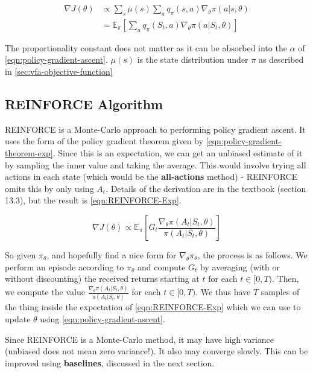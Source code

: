 \documentclass[11pt]{report}
\begin{document}
\begin{align}
	\label{eqn:policy-gradient-theorem}
	\nabla J(\theta) &\propto \sum_s \mu(s) \sum_a q_\pi(s, a) \nabla_{\theta} \pi (a | s, \theta)\\
		\label{eqn:policy-gradient-theorem-exp}
		&= \mathbb{E}_\pi\left[\sum_a q_\pi(S_t, a) \nabla_{\theta} \pi (a | S_t, \theta)\right]
\end{align}

The proportionality constant does not matter as it can be absorbed into the $\alpha$ of \autoref{eqn:policy-gradient-ascent}. $\mu(s)$ is the state distribution under $\pi$ as described in \autoref{sec:vfa-objective-function}

\subsection{REINFORCE Algorithm}
REINFORCE is a Monte-Carlo approach to performing policy gradient ascent. It uses the form of the policy gradient theorem given by \autoref{eqn:policy-gradient-theorem-exp}. Since this is an expectation, we can get an unbiased estimate of it by sampling the inner value and taking the average. This would involve trying all actions in each state (which would be the \textbf{all-actions} method) - REINFORCE omits this by only using $A_t$. Details of the derivation are in the textbook (section 13.3), but the result is \autoref{eqn:REINFORCE-Exp}.

\begin{equation}
	\label{eqn:REINFORCE-Exp}
	\nabla J(\theta) \propto \mathbb{E}_\pi\left[G_t \frac{\nabla_{\theta} \pi (A_t | S_t, \theta)}{\pi(A_t | S_t, \theta)}\right]
\end{equation}

So given $\pi_\theta$, and hopefully find a nice form for $\nabla_\theta \pi_\theta$, the process is as follows. We perform an episode according to $\pi_\theta$ and compute $G_t$ by averaging (with or without discounting) the received returns starting at $t$ for each $t \in [0, T)$. Then, we compute the value $\frac{\nabla_{\theta} \pi (A_t | S_t, \theta)}{\pi(A_t | S_t, \theta)}$ for each $t \in [0, T)$. We thus have $T$ samples of the thing inside the expectation of \autoref{eqn:REINFORCE-Exp} which we can use to update $\theta$ using \autoref{eqn:policy-gradient-ascent}.


Since REINFORCE is a Monte-Carlo method, it may have high variance (unbiased does not mean zero variance!). It also may converge slowly. This can be improved using \textbf{baselines}, discussed in the next section.
\end{document}
